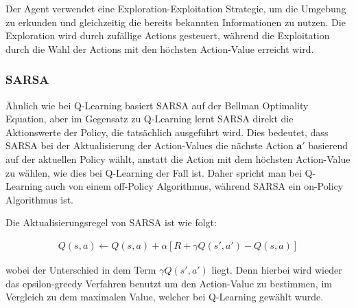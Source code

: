 Der Agent verwendet eine Exploration-Exploitation Strategie, um die Umgebung zu erkunden und gleichzeitig die bereits bekannten Informationen zu nutzen. Die Exploration wird durch zufällige Actions gesteuert, während die Exploitation durch die Wahl der Actions mit den höchsten Action-Value erreicht wird.



\subsubsection{SARSA}

Ähnlich wie bei Q-Learning basiert SARSA auf der Bellman Optimality Equation, aber im Gegensatz zu Q-Learning lernt SARSA direkt die Aktionswerte der Policy, die tatsächlich ausgeführt wird. Dies bedeutet, dass SARSA bei der Aktualisierung der Action-Values die nächste Action $\bm{a'}$ basierend auf der aktuellen Policy wählt, anstatt die Action mit dem höchsten Action-Value zu wählen, wie dies bei Q-Learning der Fall ist.
Daher spricht man bei Q-Learning auch von einem off-Policy Algorithmus, während SARSA ein on-Policy Algorithmus ist. 

Die Aktualisierungsregel von SARSA ist wie folgt:

\begin{align}
    Q(s,a) \leftarrow Q(s,a) + \alpha [R + \gamma Q(s',a') - Q(s,a)]
\end{align}

wobei der Unterschied in dem Term $\gamma Q(s',a')$ liegt. Denn hierbei wird wieder das epsilon-greedy Verfahren benutzt um den Action-Value zu bestimmen, im Vergleich zu dem maximalen Value, welcher bei Q-Learning gewählt wurde.